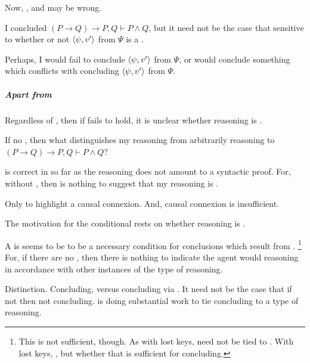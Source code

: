 \begin{note}
  Now, , and  may be wrong.

  I concluded \((P \rightarrow Q) \rightarrow P, Q \vdash P \land Q\), but it need not be the case that sensitive to whether or not \(\langle \psi, v' \rangle\) from \(\Psi\) is a \fc{}.

  Perhaps, I would fail to conclude \(\langle \psi, v' \rangle\) from \(\Psi\), or would conclude something which conflicts with concluding \(\langle \psi, v' \rangle\) from \(\Psi\).
\end{note}

\subparagraph{Apart from }

\begin{note}
  Regardless of , then if \requ{} fails to hold, it is unclear whether reasoning is \sR{}.

  If no \requ{}, then what distinguishes my reasoning from arbitrarily reasoning to \((P \rightarrow Q) \rightarrow P, Q \vdash P \land Q\)?

   is correct in so far as the reasoning does not amount to a syntactic proof.
  For, without , then is nothing to suggest that my reasoning is \sR{}.
\end{note}

\begin{note}
  Only to highlight a causal connexion.
  And, causal connexion is insufficient.


\end{note}

\begin{note}
  The motivation for the conditional rests on whether reasoning is \sR{}.

  A \requ{} is seems to be to be a necessary condition for conclusions which result from \sR{}.%
  \footnote{
    This is not sufficient, though.
    As with lost keys, \requ{} need not be tied to \sR{}.
    With lost keys, \sR{}, but whether that is sufficient for concluding.
  }
  For, if there are no , then there is nothing to indicate the agent would reasoning in accordance with other instances of the type of reasoning.
\end{note}

\begin{note}
  Distinction.
  Concluding, versus concluding via .
  It need not be the case that if not  then not concluding.
  \requ{} is doing substantial work to tie concluding to a type of reasoning.
\end{note}

